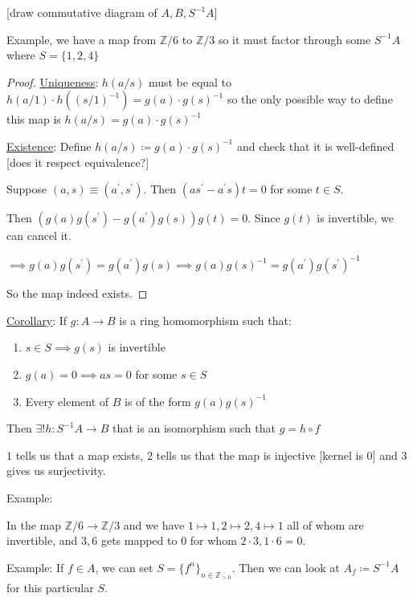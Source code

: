 \documentclass{article}
\theoremstyle{definition}
\begin{document}
[draw commutative diagram of \(A, B, S ^{-1} A\)]

Example, we have a map from \(\mathbb{Z} / 6\) to \(\mathbb{Z} / 3\) so it must factor through some \(S ^{-1} A\) where \(S = \{ 1,2,4 \} \) 

\begin{proof}
    \underline{Uniqueness}: \(h(a / s)\) must be equal to \(h(a / 1)\cdot h((s / 1)^{-1}) = g(a)\cdot g(s)^{-1}\) so the only possible way to define this map is \(h(a / s)=g(a)\cdot g(s)^{-1}\) 

    \underline{Existence}: Define \(h(a / s) \coloneqq g(a)\cdot g(s)^{-1}\) and check that it is well-defined [does it respect equivalence?]

    Suppose \((a,s)\equiv (a^{\prime} ,s^{\prime} )\). Then \((as^{\prime} -a^{\prime} s)t = 0\) for some \(t\in S\).
    
    Then \((g(a)g(s^{\prime} )-g(a^{\prime})g(s))g(t) = 0\). Since \(g(t)\) is invertible, we can cancel it.
    
    \(\implies g(a)g(s^{\prime} ) = g(a^{\prime} )g(s) \implies g(a)g(s)^{-1} = g(a^{\prime} )g(s^{\prime} )^{-1}\) 
    
    So the map indeed exists.

\end{proof}

\underline{Corollary}: If \(g: A \to B\) is a ring homomorphism such that:

\begin{enumerate}
    \item \(s\in S \implies g(s)\) is invertible
    \item \(g(a) = 0 \implies as = 0\) for some \(s\in S\) 
    \item Every element of \(B\) is of the form \(g(a)g(s)^{-1}\) 
\end{enumerate}

Then \(\exists !h:S ^{-1} A \to B\) that is an isomorphism such that \(g = h \circ f\) 

\(1\) tells us that a map exists, \(2\) tells us that the map is injective [kernel is 0] and \(3\) gives us surjectivity.

Example:

In the map \(\mathbb{Z} / 6 \to \mathbb{Z} / 3\) and we have \(1 \mapsto 1, 2 \mapsto 2, 4 \mapsto 1\) all of whom are invertible, and \(3,6\) gets mapped to \(0\) for whom \(2\cdot 3, 1\cdot 6 = 0\).

Example: If \(f\in A\), we can set \(S = \{ f^n \} _{n\in \mathbb{Z} _{>0}}\). Then we can look at \(A_f \coloneqq S ^{-1} A\) for this particular \(S\).
\end{document}
